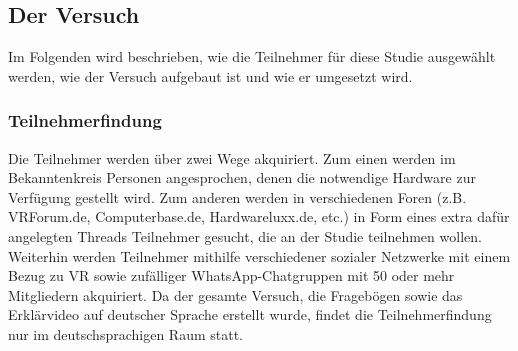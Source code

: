 \documentclass[a4paper,11pt]{article}%
\renewcommand{\\}{\vspace*{0.5\baselineskip} \newline}
\begin{document}
\subsection{Der Versuch}
Im Folgenden wird beschrieben, wie die Teilnehmer für diese Studie ausgewählt werden, wie der Versuch aufgebaut ist und wie er umgesetzt wird.
	\subsubsection{Teilnehmerfindung}
Die Teilnehmer werden über zwei Wege akquiriert. Zum einen werden im Bekanntenkreis Personen angesprochen, denen die notwendige Hardware zur Verfügung gestellt wird. Zum anderen werden in verschiedenen Foren (z.B. VRForum.de, Computerbase.de, Hardwareluxx.de, etc.) in Form eines extra dafür angelegten Threads Teilnehmer gesucht, die an der Studie teilnehmen wollen. Weiterhin werden Teilnehmer mithilfe verschiedener sozialer Netzwerke mit einem Bezug zu VR sowie zufälliger WhatsApp-Chatgruppen mit 50 oder mehr Mitgliedern akquiriert. Da der gesamte Versuch, die Fragebögen sowie das Erklärvideo auf deutscher Sprache erstellt wurde, findet die Teilnehmerfindung nur im deutschsprachigen Raum statt.
\end{document}
